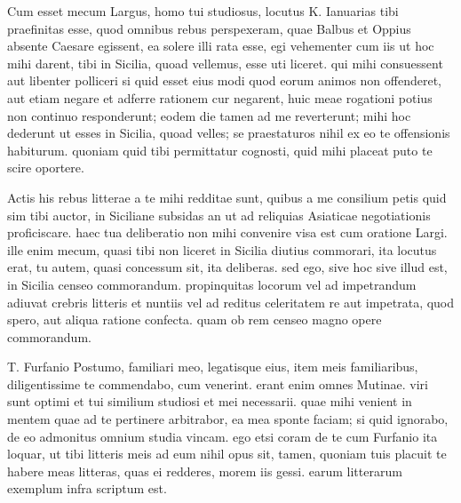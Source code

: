 


 Cum esset mecum Largus, homo tui studiosus, locutus K. Ianuarias tibi praefinitas esse, quod omnibus rebus perspexeram, quae Balbus et Oppius absente Caesare egissent, ea solere illi rata esse, egi vehementer cum iis ut hoc mihi darent, tibi in Sicilia, quoad vellemus, esse uti liceret. qui mihi consuessent aut libenter polliceri si quid esset eius modi quod eorum animos non offenderet, aut etiam negare et adferre rationem cur negarent, huic meae rogationi potius non continuo responderunt; eodem die tamen ad me reverterunt; mihi hoc dederunt ut esses in Sicilia, quoad velles; se praestaturos nihil ex eo te offensionis habiturum. quoniam quid tibi permittatur cognosti, quid mihi placeat puto te scire oportere.

 Actis his rebus litterae a te mihi redditae sunt, quibus a me consilium petis quid sim tibi auctor, in Siciliane subsidas an ut ad reliquias Asiaticae negotiationis proficiscare. haec tua deliberatio non mihi convenire visa est cum oratione Largi. ille enim mecum, quasi tibi non liceret in Sicilia diutius commorari, ita locutus erat, tu autem, quasi concessum sit, ita deliberas. sed ego, sive hoc sive illud est, in Sicilia censeo commorandum. propinquitas locorum vel ad impetrandum adiuvat crebris litteris et nuntiis vel ad reditus celeritatem re aut impetrata, quod spero, aut aliqua ratione confecta. quam ob rem censeo magno opere commorandum.

 T. Furfanio Postumo, familiari meo, legatisque eius, item meis familiaribus, diligentissime te commendabo, cum venerint. erant enim omnes Mutinae. viri sunt optimi et tui similium studiosi et mei necessarii. quae mihi venient in mentem quae ad te pertinere arbitrabor, ea mea sponte faciam; si quid ignorabo, de eo admonitus omnium studia vincam. ego etsi coram de te cum Furfanio ita loquar, ut tibi litteris meis ad eum nihil opus sit, tamen, quoniam tuis placuit te habere meas litteras, quas ei redderes, morem iis gessi. earum litterarum exemplum infra scriptum est.

